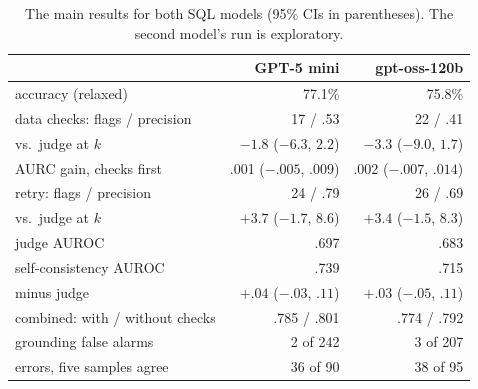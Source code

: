 \documentclass[conference]{IEEEtran}
\begin{document}
\begin{table}[t]
\centering\footnotesize
\setlength{\tabcolsep}{2.5pt}
\begin{tabular}{lrr}
\toprule
 & GPT-5 mini & gpt-oss-120b \\
\midrule
accuracy (relaxed) & 77.1\% & 75.8\% \\
data checks: flags / precision & 17 / .53 & 22 / .41 \\
\quad vs.\ judge at $k$ & $-1.8$ ($-6.3$, $2.2$) & $-3.3$ ($-9.0$, $1.7$) \\
\quad AURC gain, checks first & .001 ($-.005$, $.009$) & .002 ($-.007$, $.014$) \\
retry: flags / precision & 24 / .79 & 26 / .69 \\
\quad vs.\ judge at $k$ & $+3.7$ ($-1.7$, $8.6$) & $+3.4$ ($-1.5$, $8.3$) \\
judge AUROC & .697 & .683 \\
self-consistency AUROC & .739 & .715 \\
\quad minus judge & $+.04$ ($-.03$, $.11$) & $+.03$ ($-.05$, $.11$) \\
combined: with / without checks & .785 / .801 & .774 / .792 \\
grounding false alarms & 2 of 242 & 3 of 207 \\
errors, five samples agree & 36 of 90 & 38 of 95 \\
\bottomrule
\end{tabular}
\caption{The main results for both SQL models (95\% CIs in parentheses). The second model's run is
exploratory.}
\label{tab:models}
\end{table}
\end{document}
